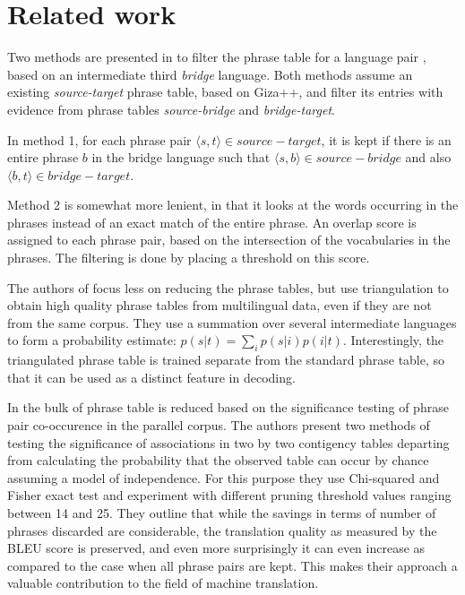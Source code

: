 \documentclass[11pt]{article}
\begin{document}
\section{Related work}

Two methods are presented in \cite{chen} to filter the phrase table for a language pair%
, based on an intermediate third \emph{bridge} language. 
 Both methods assume an existing {\em source-target} phrase table, based on Giza++, and filter its entries with evidence from phrase tables {\em source-bridge} and {\em bridge-target}.

In method 1, for each phrase pair $\langle s, t\rangle \in source-target$, it is kept if there is an entire phrase $b$ in the bridge language such that $\langle s,b\rangle \in source-bridge$ and also $\langle b,t\rangle \in bridge-target$.

Method 2 is somewhat more lenient, in that it looks at the words occurring in the phrases instead of an exact match of the entire phrase. An overlap score is assigned to each phrase pair, based on the intersection of the vocabularies in the phrases. The filtering is done by placing a threshold on this score.

The authors of \cite{cohn} focus less on reducing the phrase tables, but use triangulation to obtain high quality phrase tables from multilingual data, even if they are not from the same corpus. They use a summation over several intermediate languages to form a probability estimate: $p(s|t)=\sum_i p(s|i)p(i|t)$. Interestingly, the triangulated phrase table is trained separate from the standard phrase table, so that it can be used as a distinct feature in decoding.

In \cite{Johnson} the bulk of phrase table is reduced based on the significance testing of phrase pair co-occurence in the parallel corpus. The authors present two methods of testing the significance of associations in two by two contigency tables departing from calculating the probability that the observed table can occur by chance assuming a model of independence. For this purpose they use Chi-squared and Fisher exact test and experiment with different pruning threshold values ranging between 14 and 25. They outline that while the savings in terms of number of phrases discarded are considerable, the translation quality as measured by the BLEU score is preserved, and even more surprisingly it can even increase as compared to the case when all phrase pairs are kept. This makes their approach a valuable contribution to the field of machine translation.
\end{document}
